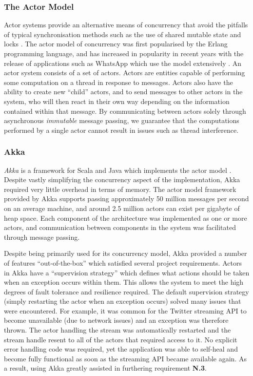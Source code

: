 \documentclass{l4proj}
\begin{document}
    \subsubsection{The Actor Model}

Actor systems provide an alternative means of concurrency that avoid the pitfalls of typical synchronisation methods such as the use of shared mutable state and locks \cite{actormodel}. The actor model of concurrency was first popularised by the Erlang programming language, and has increased in popularity in recent years with the release of applications such as WhatsApp which use the model extensively \cite{erlang}. An actor system consists of a set of actors. Actors are entities capable of performing some computation on a thread in response to messages. Actors also have the ability to create new “child” actors, and to send messages to other actors in the system, who will then react in their own way depending on the information contained within that message. By communicating between actors solely through asynchronous \textit{immutable} message passing, we guarantee that the computations performed by a single actor cannot result in issues such as thread interference.

\subsubsection{Akka}

    \textit{Akka} is a framework for Scala and Java which implements the actor model \cite{akka}. Despite vastly simplifying the concurrency aspect of the implementation, Akka required very little overhead in terms of memory. The actor model framework provided by Akka supports passing approximately 50 million messages per second on an average machine, and around 2.5 million actors can exist per gigabyte of heap space. Each component of the architecture was implemented as one or more actors, and communication between components in the system was facilitated through message passing.
                    
        Despite being primarily used for its concurrency model, Akka provided a number of features ``out-of-the-box'' which satisfied several project requirements. Actors in Akka have a ``supervision strategy'' which defines what actions should be taken when an exception occurs within them. This allows the system to meet the high degrees of fault tolerance and resilience required. The default supervision strategy (simply restarting the actor when an exception occurs) solved many issues that were encountered. For example, it was common for the Twitter streaming API to become unavailable (due to network issues) and an exception was therefore thrown. The actor handling the stream was automatically restarted and the stream handle resent to all of the actors that required access to it. No explicit error handling code was required, yet the application was able to self-heal and become fully functional as soon as the streaming API became available again. As a result, using Akka greatly assisted in furthering requirement \textbf{N.3}.
\end{document}
